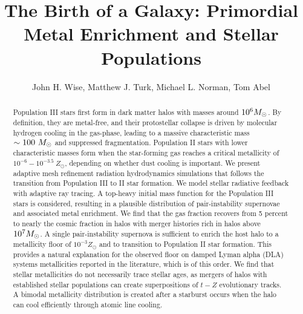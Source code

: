 \documentclass[apjl]{emulateapj}
\begin{document}

\title{The Birth of a Galaxy: Primordial Metal Enrichment and Stellar
  Populations}

\author{John H. Wise, 
  Matthew J. Turk,
  Michael L. Norman,
  Tom Abel}


\begin{abstract}

  Population III stars first form in dark matter halos with masses
  around $10^6 \Ms$.  By definition, they are metal-free, and their
  protostellar collapse is driven by molecular hydrogen cooling in the
  gas-phase, leading to a massive characteristic mass $\sim 100~\Ms$
  and suppressed fragmentation.  Population II stars with lower
  characteristic masses form when the star-forming gas reaches a
  critical metallicity of $10^{-6} - 10^{-3.5}~Z_\odot$, depending on
  whether dust cooling is important.  We present adaptive mesh
  refinement radiation hydrodynamics simulations that follows the
  transition from Population III to II star formation.  We model
  stellar radiative feedback with adaptive ray tracing.  A top-heavy
  initial mass function for the Population III stars is considered,
  resulting in a plausible distribution of pair-instability supernovae
  and associated metal enrichment.  We find that the gas fraction
  recovers from 5 percent to nearly the cosmic fraction in halos with
  merger histories rich in halos above $10^7 \Ms$.  A single
  pair-instability supernova is sufficient to enrich the host halo to
  a metallicity floor of $10^{-3} Z_\odot$ and to transition to
  Population II star formation.  This provides a natural explanation
  for the observed floor on damped Lyman alpha (DLA) systems
  metallicities reported in the literature, which is of this order.
  We find that stellar metallicities do not necessarily trace stellar
  ages, as mergers of halos with established stellar populations can
  create superpositions of $t-Z$ evolutionary tracks.  A bimodal
  metallicity distribution is created after a starburst occurs when
  the halo can cool efficiently through atomic line cooling.

\end{abstract}
\end{document}
